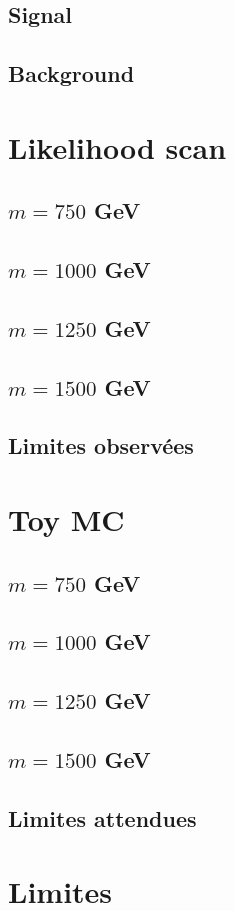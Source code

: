 \documentclass[twoside,12pt]{article}
\begin{document}
\subsection{Signal}


\subsection{Background}


\section{Likelihood scan}

\subsection{$m = 750$ GeV}


\subsection{$m = 1000$ GeV}


\subsection{$m = 1250$ GeV}


\subsection{$m = 1500$ GeV}


\subsection{Limites observées}


\section{Toy MC}


\subsection{$m = 750$ GeV}


\subsection{$m = 1000$ GeV}


\subsection{$m = 1250$ GeV}


\subsection{$m = 1500$ GeV}


\subsection{Limites attendues}


\section{Limites}

\end{document}
